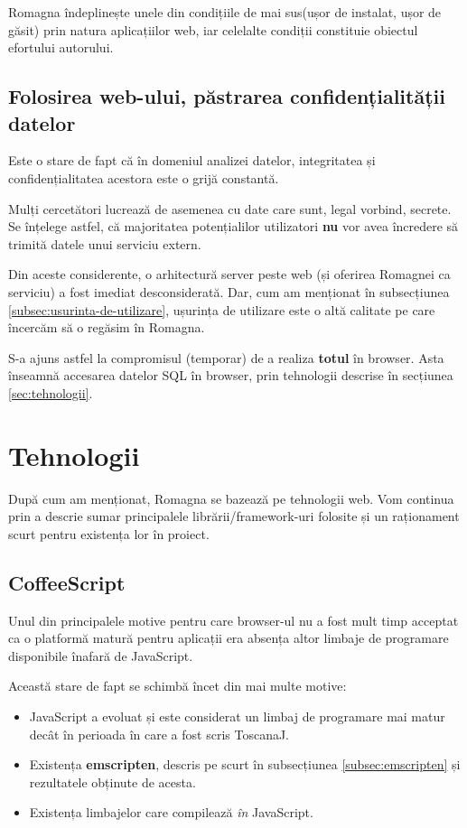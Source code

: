 \documentclass[12pt, a4paper, twoside, romanian]{teza-upb}
\begin{document}
      Romagna îndeplinește unele din condițiile de mai sus(ușor de instalat, ușor de găsit) prin natura aplicațiilor web, iar celelalte condiții constituie obiectul efortului autorului.

    \subsection{Folosirea web-ului, păstrarea confidențialității datelor}
    \label{subsec:confidentiality}

      Este o stare de fapt că în domeniul analizei datelor, integritatea și confidențialitatea acestora este o grijă constantă.

      Mulți cercetători lucrează de asemenea cu date care sunt, legal vorbind, secrete. Se înțelege astfel, că majoritatea potențialilor utilizatori \textbf{nu} vor avea încredere să trimită datele unui serviciu extern.

      Din aceste considerente, o arhitectură server peste web (și oferirea Romagnei ca serviciu) a fost imediat desconsiderată. Dar, cum am menționat în subsecțiunea \ref{subsec:usurinta-de-utilizare}, ușurința de utilizare este o altă calitate pe care încercăm să o regăsim în Romagna. 
      
      S-a ajuns astfel la compromisul (temporar) de a realiza \textbf{totul} în browser. Asta înseamnă accesarea datelor SQL în browser, prin tehnologii descrise în secțiunea \ref{sec:tehnologii}.

  \section{Tehnologii}
  \label{sec:tehnlogii}

    După cum am menționat, Romagna se bazează pe tehnologii web. Vom continua prin a descrie sumar principalele librării/framework-uri folosite și un raționament scurt pentru existența lor în proiect.

    \subsection{CoffeeScript}
      Unul din principalele motive pentru care browser-ul nu a fost mult timp acceptat ca o platformă matură pentru aplicații era absența altor limbaje de programare disponibile înafară de JavaScript.

      Această stare de fapt se schimbă încet din mai multe motive:
      \begin{itemize}
        \item JavaScript a evoluat și este considerat un limbaj de programare mai matur decât în perioada în care a fost scris ToscanaJ.
        \item Existența \textbf{emscripten}, descris pe scurt în subsecțiunea \ref{subsec:emscripten} și rezultatele obținute de acesta.
        \item Existența limbajelor care compilează \textit{în} JavaScript.
      \end{itemize}
\end{document}

